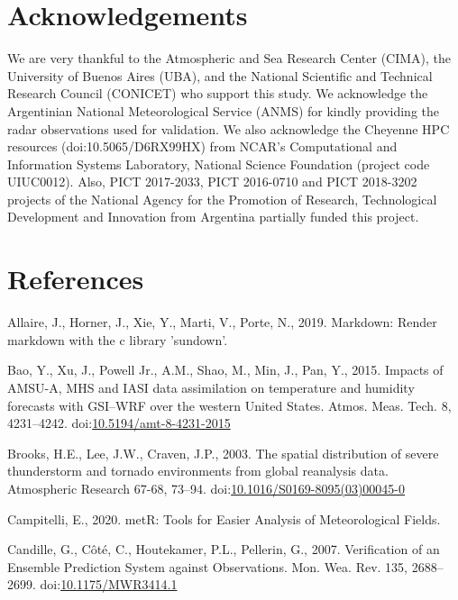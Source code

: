 \documentclass[final,5p,times,twocolumn,authoryear]{elsarticle} %
\begin{document}
\hypertarget{acknowledgements}{%
\section{Acknowledgements}\label{acknowledgements}}

We are very thankful to the Atmospheric and Sea Research Center (CIMA), the University of Buenos Aires (UBA), and the National Scientific and Technical Research Council (CONICET) who support this study. We acknowledge the Argentinian National Meteorological Service (ANMS) for kindly providing the radar observations used for validation. We also acknowledge the Cheyenne HPC resources (doi:10.5065/D6RX99HX) from NCAR's Computational and Information Systems Laboratory, National Science Foundation (project code UIUC0012). Also, PICT 2017-2033, PICT 2016-0710 and PICT 2018-3202 projects of the National Agency for the Promotion of Research, Technological Development and Innovation from Argentina partially funded this project.

\hypertarget{references}{%
\section*{References}\label{references}}

\hypertarget{refs}{}
\leavevmode\hypertarget{ref-allaire2019}{}%
Allaire, J., Horner, J., Xie, Y., Marti, V., Porte, N., 2019. Markdown: Render markdown with the c library 'sundown'.

\leavevmode\hypertarget{ref-bao2015}{}%
Bao, Y., Xu, J., Powell Jr., A.M., Shao, M., Min, J., Pan, Y., 2015. Impacts of AMSU-A, MHS and IASI data assimilation on temperature and humidity forecasts with GSI--WRF over the western United States. Atmos. Meas. Tech. 8, 4231--4242. doi:\href{https://doi.org/10.5194/amt-8-4231-2015}{10.5194/amt-8-4231-2015}

\leavevmode\hypertarget{ref-brooks2003}{}%
Brooks, H.E., Lee, J.W., Craven, J.P., 2003. The spatial distribution of severe thunderstorm and tornado environments from global reanalysis data. Atmospheric Research 67-68, 73--94. doi:\href{https://doi.org/10.1016/S0169-8095(03)00045-0}{10.1016/S0169-8095(03)00045-0}

\leavevmode\hypertarget{ref-campitelli2020}{}%
Campitelli, E., 2020. metR: Tools for Easier Analysis of Meteorological Fields.

\leavevmode\hypertarget{ref-candille2007}{}%
Candille, G., Côté, C., Houtekamer, P.L., Pellerin, G., 2007. Verification of an Ensemble Prediction System against Observations. Mon. Wea. Rev. 135, 2688--2699. doi:\href{https://doi.org/10.1175/MWR3414.1}{10.1175/MWR3414.1}
\end{document}
